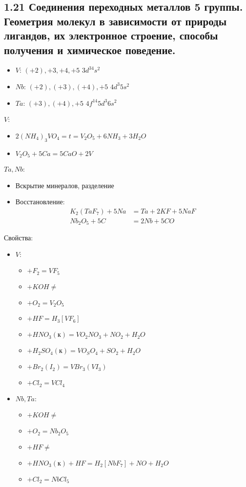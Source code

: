 \subsection{1.21 Соединения переходных металлов 5 группы. Геометрия молекул в зависимости от природы лигандов, их электронное строение, способы получения и химическое поведение.}
\begin{itemize}
	\item $V$: $(+2), +3, +4, +5$ \quad $3d^34s^2$
	\item $Nb$: $(+2), (+3), (+4), +5$ \quad $4d^3 5s^2$
	\item $Ta$: $(+3), (+4), +5$ \quad $4f^{14} 5d^3 6s^2$
\end{itemize}
$V$:
\begin{itemize}
	\item $2(NH_4)_3VO_4 = t = V_2O_5 + 6 NH_3 + 3 H_2O$
	\item $V_2O_5 + 5 Ca = 5CaO + 2V$
\end{itemize}
$Ta, Nb$:
\begin{itemize}
	\item Вскрытие минералов, разделение
	\item Восстановление:
	\begin{align*}
		K_2(TaF_7) + 5 Na &= Ta + 2KF + 5 NaF \\
		Nb_2O_5 + 5C &= 2Nb + 5CO
	\end{align*}
\end{itemize}
Свойства:
\begin{itemize}
	\item $V$:
	\begin{itemize}
		\item $+ F_2 = VF_5$
		\item $+ KOH \not = $
		\item $+ O_2 = V_2O_5 $
		\item $+ HF = H_3\left[VF_6 \right] $
		\item $+ HNO_3(\text{к}) = VO_2NO_3 + NO_2 + H_2O$	
		\item $+ H_2SO_4 (\text{к}) = VO_SO_4 + SO_2 + H_2O  $
		\item $+ Br_2(I_2) = VBr_3(VI_3) $
		\item $+ Cl_2 = VCl_4 $	
	\end{itemize}
	\item $Nb, Ta$:
	\begin{itemize}
		\item $+ KOH \not = $
		\item $+ O_2 = Nb_2O_5 $
		\item $+ HF \not =  $
		\item $+ HNO_3(\text{к}) + HF = H_2\left[NbF_7 \right] + NO + H_2O $	
		\item $+ Cl_2 = NbCl_5 $		
	\end{itemize}
\end{itemize}
